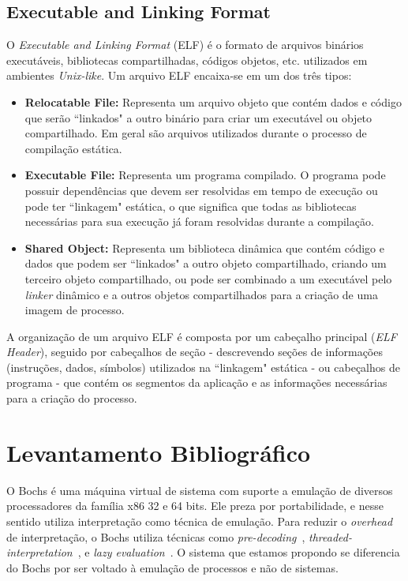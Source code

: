 \documentclass[11pt,twoside]{article}
\begin{document}
\subsection{Executable and Linking Format}

O \emph{Executable and Linking Format} (ELF) \cite{SCO1997} é o formato de
arquivos binários executáveis, bibliotecas compartilhadas, códigos objetos,
etc. utilizados em ambientes \emph{Unix-like}. Um arquivo ELF encaixa-se em um
dos três tipos:

\begin{itemize}
 	\item \textbf{Relocatable File:} Representa um arquivo objeto que contém
          dados e código que serão ``linkados" a outro binário para criar um
          executável ou objeto compartilhado. Em geral são arquivos utilizados
          durante o processo de compilação estática.
 
 	\item \textbf{Executable File:} Representa um programa compilado. O
          programa pode possuir dependências que devem ser resolvidas em tempo
          de execução ou pode ter ``linkagem" estática, o que significa que
          todas as bibliotecas necessárias para sua execução já foram resolvidas
          durante a compilação.
 
 	\item \textbf{Shared Object:} Representa um biblioteca dinâmica que
          contém código e dados que podem ser ``linkados" a outro objeto
          compartilhado, criando um terceiro objeto compartilhado, ou pode ser
          combinado a um executável pelo \emph{linker} dinâmico e a outros
          objetos compartilhados para a criação de uma imagem de processo.
\end{itemize}

A organização de um arquivo ELF é composta por um cabeçalho principal (\emph{ELF
  Header}), seguido por cabeçalhos de seção - descrevendo seções de informações
(instruções, dados, símbolos) utilizados na ``linkagem" estática - ou cabeçalhos
de programa - que contém os segmentos da aplicação e as informações necessárias
para a criação do processo.


\section{Levantamento Bibliográfico}  \label{sec:bibliografia}

O Bochs \cite{bochs} é uma máquina virtual de sistema com suporte a emulação de
diversos processadores da família x86 32 e 64 bits. Ele preza por portabilidade,
e nesse sentido utiliza interpretação como técnica de emulação. Para reduzir o
\emph{overhead} de interpretação, o Bochs utiliza técnicas como
\emph{pre-decoding}~\cite{Magnusson1994},
\emph{threaded-interpretation}~\cite{Klint1981}, e \emph{lazy
  evaluation}~\cite{Hookway1997}.  O sistema que estamos propondo se diferencia
do Bochs por ser voltado à emulação de processos e não de sistemas.
\end{document}
